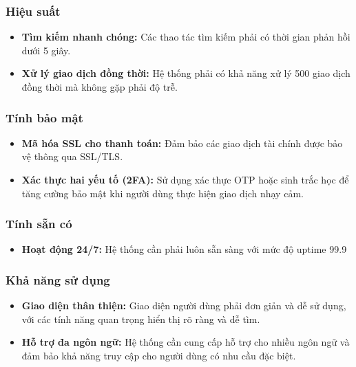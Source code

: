 \subsubsection{Hiệu suất}
\begin{itemize}
    \item \textbf{Tìm kiếm nhanh chóng:} Các thao tác tìm kiếm phải có thời gian phản hồi dưới 5 giây.
    \item \textbf{Xử lý giao dịch đồng thời:} Hệ thống phải có khả năng xử lý 500 giao dịch đồng thời mà không gặp phải độ trễ.
\end{itemize}

\subsubsection{Tính bảo mật}
\begin{itemize}
    \item \textbf{Mã hóa SSL cho thanh toán:} Đảm bảo các giao dịch tài chính được bảo vệ thông qua SSL/TLS.
    \item \textbf{Xác thực hai yếu tố (2FA):} Sử dụng xác thực OTP hoặc sinh trắc học để tăng cường bảo mật khi người dùng thực hiện giao dịch nhạy cảm.
\end{itemize}

\subsubsection{Tính sẵn có}
\begin{itemize}
    \item \textbf{Hoạt động 24/7:} Hệ thống cần phải luôn sẵn sàng với mức độ uptime 99.9%
    
\end{itemize}



\subsubsection{Khả năng sử dụng}
\begin{itemize}
    \item \textbf{Giao diện thân thiện:} Giao diện người dùng phải đơn giản và dễ sử dụng, với các tính năng quan trọng hiển thị rõ ràng và dễ tìm.
    \item \textbf{Hỗ trợ đa ngôn ngữ:} Hệ thống cần cung cấp hỗ trợ cho nhiều ngôn ngữ và đảm bảo khả năng truy cập cho người dùng có nhu cầu đặc biệt.
\end{itemize}

